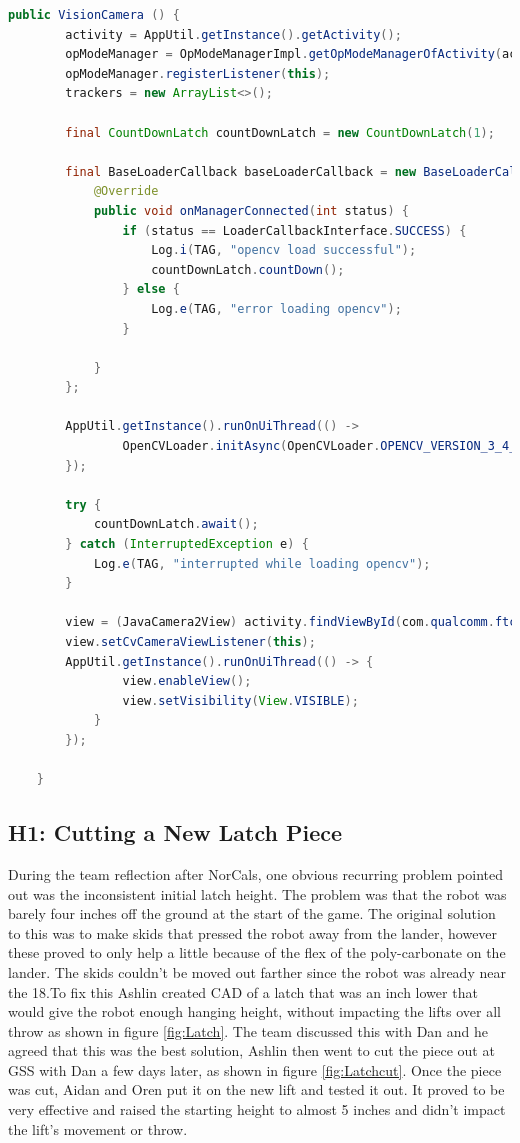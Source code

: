\documentclass{article}
\begin{document}
\begin{lstlisting}[language=Java]
    public VisionCamera () {
        activity = AppUtil.getInstance().getActivity();
        opModeManager = OpModeManagerImpl.getOpModeManagerOfActivity(activity);
        opModeManager.registerListener(this);
        trackers = new ArrayList<>();

        final CountDownLatch countDownLatch = new CountDownLatch(1);

        final BaseLoaderCallback baseLoaderCallback = new BaseLoaderCallback(activity) {
            @Override
            public void onManagerConnected(int status) {
                if (status == LoaderCallbackInterface.SUCCESS) {
                    Log.i(TAG, "opencv load successful");
                    countDownLatch.countDown();
                } else {
                    Log.e(TAG, "error loading opencv");
                }

            }
        };

        AppUtil.getInstance().runOnUiThread(() -> 
                OpenCVLoader.initAsync(OpenCVLoader.OPENCV_VERSION_3_4_0, activity, baseLoaderCallback);
        });

        try {
            countDownLatch.await();
        } catch (InterruptedException e) {
            Log.e(TAG, "interrupted while loading opencv");
        }

        view = (JavaCamera2View) activity.findViewById(com.qualcomm.ftcrobotcontroller.R.id.cameraViewId);
        view.setCvCameraViewListener(this);
        AppUtil.getInstance().runOnUiThread(() -> {
                view.enableView();
                view.setVisibility(View.VISIBLE);
            }
        });

    }
\end{lstlisting}
\subsection{H1: Cutting a New Latch Piece}

During the team reflection after NorCals, one obvious recurring problem pointed out was the inconsistent initial latch height. The problem was that the robot was barely four inches off the ground at the start of the game. The original solution to this was to make skids that pressed the robot away from the lander, however these proved to only help a little because of the flex of the poly-carbonate on the lander. The skids couldn't be moved out farther since the robot was already near the 18.To fix this Ashlin created CAD of a latch that was an inch lower that would give the robot enough hanging height, without impacting the lifts over all throw as shown in figure \ref{fig:Latch}. The team discussed this with Dan and he agreed that this was the best solution, Ashlin then went to cut the piece out at GSS with Dan a few days later, as shown in figure  \ref{fig:Latchcut}. Once the piece was cut, Aidan and Oren put it on the new lift and tested it out. It proved to be very effective and raised the starting height to almost 5 inches and didn't impact the lift's movement or throw.
\end{document}
